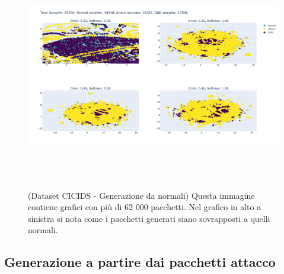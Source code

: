 \begin{figure}[htpb]
    \centering
    \includegraphics[width=\textwidth,height=10cm,keepaspectratio=true]{img/gen_test/cicids/CICIDS18_normal_only_12k_ood.png}
    \caption{
      (Dataset CICIDS - Generazione da normali) Questa immagine contiene grafici con più di 62 000 pacchetti. Nel grafico in alto a sinistra si nota come i pacchetti generati siano sovrapposti a quelli normali.
    }
    \label{fig:gen_CICIDS_norm_2}
\end{figure}


\subsection{Generazione a partire dai pacchetti attacco}

